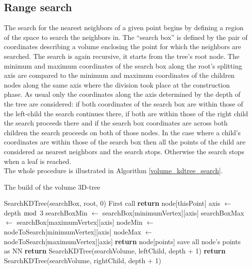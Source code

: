 \subsection{Range search}
The search for the nearest neighbors of a given point begins by defining a region of the space to search the neighbors in.
The ``search box'' is defined by the pair of coordinates describing a volume enclosing the point for which the neighbors are searched. The search is again recursive, it starts from the tree's root node. The minimum and maximum coordinates of the search box along the root's splitting axis are compared to the minimum and maximum coordinates of the children nodes along the same axis where the division took place at the construction phase. As usual only the coordinates along the axis determined by the depth of the tree are considered: if both coordinates of the search box are within those of the left-child  the search continues there, if both are within those of the right child the search proceeds there and if the search box coordinates are across both children the search proceeds on both of those nodes. In the case where a child's coordinates are within those of the search box then all the points of the child are considered as nearest neighbors and the search stops. Otherwise the search stops when a leaf is reached.\\
The whole procedure is illustrated in Algorithm \ref{volume_kdtree_search}.\\
\begin{algorithm}
\caption{The build of the volume 3D-tree}
\label{volume_kdtree_search}
\begin{algorithmic}
\State SearchKDTree(searchBox, root, 0) \Comment First call
    \State \textbf{return} node[thisPoint]
  \EndIf
  \State axis $\gets$ depth $\bmod$ 3
  \State searchBoxMin $\gets$ searchBox[minimumVertex][axis]
  \State searchBoxMax $\gets$ searchBox[maximumVertex][axis]
  \State nodeMin $\gets$ nodeToSearch[minimumVertex][axis]
  \State nodeMax $\gets$ nodeToSearch[maximumVertex][axis]
  \State \textbf{return} node[points] \Comment save all node's points as NN
  \Else
  	  \State \textbf{return} SearchKDTree(searchVolume, leftChild, depth + 1)
  	\EndIf
 	  \State \textbf{return} SearchKDTree(searchVolume, rightChild, depth + 1)
	\EndIf
  \EndIf
\EndProcedure
\end{algorithmic}
\end{algorithm}

